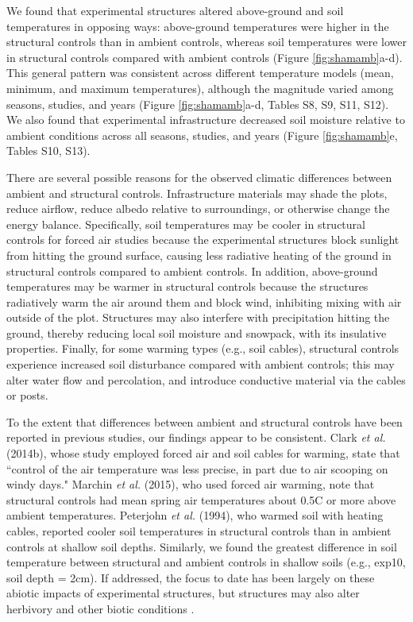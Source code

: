 \documentclass{article}
\begin{document}
\par We found that experimental structures altered above-ground and soil temperatures in opposing ways: above-ground temperatures were higher in the structural controls than in ambient controls, whereas soil temperatures were lower in structural controls compared with ambient controls (Figure \ref{fig:shamamb}a-d). This general pattern was consistent across different temperature models (mean, minimum, and maximum temperatures), although the magnitude varied among seasons, studies, and years (Figure \ref{fig:shamamb}a-d, Tables S8, S9, S11, S12). We also found that experimental infrastructure decreased soil moisture relative to ambient conditions across all seasons, studies, and years (Figure \ref{fig:shamamb}e, Tables S10, S13). 
\par There are several possible reasons for the observed climatic differences between ambient and structural controls. Infrastructure materials may shade the plots, reduce airflow, reduce albedo relative to surroundings, or otherwise change the energy balance. Specifically, soil temperatures may be cooler in structural controls for forced air studies because the experimental structures block sunlight from hitting the ground surface, causing less radiative heating of the ground in structural controls compared to ambient controls. In addition, above-ground temperatures may be warmer in structural controls because the structures radiatively warm the air around them and block wind, inhibiting mixing with air outside of the plot. Structures may also interfere with precipitation hitting the ground, thereby reducing local soil moisture and snowpack, with its insulative properties. Finally, for some warming types (e.g., soil cables), structural controls experience increased soil disturbance compared with ambient controls; this may alter water flow and percolation, and introduce conductive material via the cables or posts. 

\par To the extent that differences between ambient and structural controls have been reported in previous studies, our findings appear to be consistent. Clark \textit{et al.} (2014b), whose study employed forced air and soil cables for warming, state that ``control of the air temperature was less precise, in part due to air scooping on windy days." Marchin \textit{et al.} (2015), who used forced air warming, note that structural controls had mean spring air temperatures about 0.5\degree C or more above ambient temperatures. Peterjohn \textit{et al.} (1994), who warmed soil with heating cables, reported cooler soil temperatures in structural controls than in ambient controls at shallow soil depths. Similarly, we found the greatest difference in soil temperature between structural and ambient controls in shallow soils (e.g., exp10, soil depth = 2cm). If addressed, the focus to date has been largely on these abiotic impacts of experimental structures, but structures may also alter herbivory and other biotic conditions \citep{kennedy1995,moise2010,wolkovich2012,hoeppner2012}. 
\end{document}
